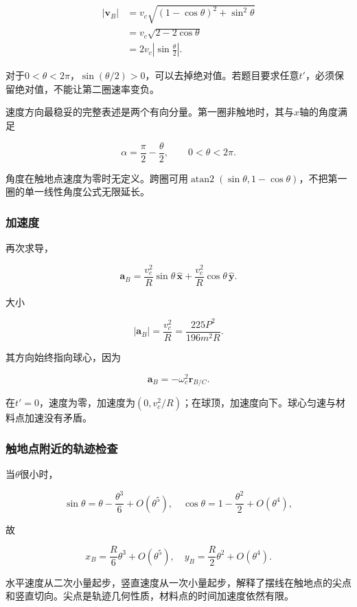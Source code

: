 \documentclass[12pt,a4paper,fontset=fandol]{ctexart}
\begin{document}
\[
\begin{aligned}
|\mathbf v_B|
&=v_c\sqrt{(1-\cos\theta)^2+\sin^2\theta}\\
&=v_c\sqrt{2-2\cos\theta}\\
&=\boxed{2v_c\left|\sin\frac{\theta}{2}\right|}.
\end{aligned}
\]

对于\(0<\theta<2\pi\)，\(\sin(\theta/2)>0\)，可以去掉绝对值。若题目要求任意\(t'\)，必须保留绝对值，不能让第二圈速率变负。

速度方向最稳妥的完整表述是两个有向分量。第一圈非触地时，其与\(x\)轴的角度满足

\[
\alpha=\frac{\pi}{2}-\frac{\theta}{2},
\qquad 0<\theta<2\pi.
\]

角度在触地点速度为零时无定义。跨圈可用\(\operatorname{atan2}(\sin\theta,1-\cos\theta)\)，不把第一圈的单一线性角度公式无限延长。

\par\noindent\begin{minipage}{\linewidth}
\subsubsection{加速度}\label{ux52a0ux901fux5ea6}

再次求导，

\[
\boxed{
\mathbf a_B=
\frac{v_c^2}{R}\sin\theta\,\hat{\mathbf x}
+\frac{v_c^2}{R}\cos\theta\,\hat{\mathbf y}}.
\]

大小

\[
\boxed{
|\mathbf a_B|=\frac{v_c^2}{R}
=\frac{225P^2}{196m^2R}}.
\]

其方向始终指向球心，因为

\[
\mathbf a_B=-\omega_c^2\mathbf r_{B/C}.
\]

在\(t'=0\)，速度为零，加速度为\((0,v_c^2/R)\)；在球顶，加速度向下。球心匀速与材料点加速没有矛盾。

\subsubsection{触地点附近的轨迹检查}\label{ux89e6ux5730ux70b9ux9644ux8fd1ux7684ux8f68ux8ff9ux68c0ux67e5}

当\(\theta\)很小时，

\[
\sin\theta=\theta-\frac{\theta^3}{6}+O(\theta^5),
\quad
\cos\theta=1-\frac{\theta^2}{2}+O(\theta^4),
\]

故

\[
x_B=\frac R6\theta^3+O(\theta^5),
\quad
y_B=\frac R2\theta^2+O(\theta^4).
\]

水平速度从二次小量起步，竖直速度从一次小量起步，解释了摆线在触地点的尖点和竖直切向。尖点是轨迹几何性质，材料点的时间加速度依然有限。

\end{minipage}\par
\clearpage
\end{document}
